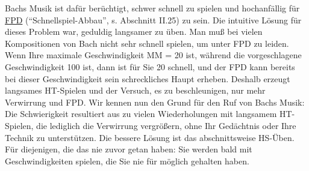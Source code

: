 Bachs Musik ist dafür berüchtigt, schwer schnell zu spielen und hochanfällig für \hyperlink{fpd}{FPD} (\enquote{Schnellspiel-Abbau}, s. Abschnitt II.25) zu sein.
Die intuitive Lösung für dieses Problem war, geduldig langsamer zu üben.
Man muß bei vielen Kompositionen von Bach nicht sehr schnell spielen, um unter FPD zu leiden.
Wenn Ihre maximale Geschwindigkeit MM = 20 ist, während die vorgeschlagene Geschwindigkeit 100 ist, dann ist für Sie 20 schnell, und der FPD kann  bereits bei dieser Geschwindigkeit sein schreckliches Haupt erheben.
Deshalb erzeugt langsames HT-Spielen und der Versuch, es zu beschleunigen, nur mehr Verwirrung und FPD.
Wir kennen nun den Grund für den Ruf von Bachs Musik: Die Schwierigkeit resultiert aus zu vielen Wiederholungen mit langsamem HT-Spielen, die lediglich die Verwirrung vergrößern, ohne Ihr Gedächtnis oder Ihre Technik zu unterstützen.
Die bessere Lösung ist das abschnittsweise HS-Üben.
Für diejenigen, die das nie zuvor getan haben: Sie werden bald mit Geschwindigkeiten spielen, die Sie nie für möglich gehalten haben.


\hypertarget{ruhig}{}

